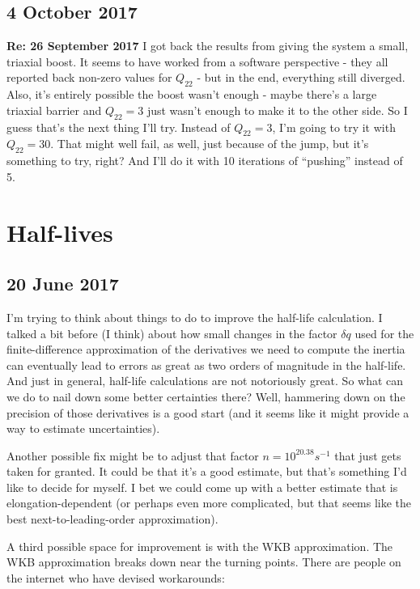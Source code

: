 \documentclass[]{report}
\begin{document}
\subsection*{4 October 2017}
\textbf{Re: 26 September 2017} I got back the results from giving the system a small, triaxial boost. It seems to have worked from a software perspective - they all reported back non-zero values for $Q_{22}$ - but in the end, everything still diverged. Also, it's entirely possible the boost wasn't enough - maybe there's a large triaxial barrier and $Q_{22}=3$ just wasn't enough to make it to the other side. So I guess that's the next thing I'll try. Instead of $Q_{22}=3$, I'm going to try it with $Q_{22}=30$. That might well fail, as well, just because of the jump, but it's something to try, right? And I'll do it with 10 iterations of ``pushing'' instead of 5.

\section*{Half-lives}
\subsection*{20 June 2017}
I'm trying to think about things to do to improve the half-life calculation. I talked a bit before (I think) about how small changes in the factor $\delta q$ used for the finite-difference approximation of the derivatives we need to compute the inertia can eventually lead to errors as great as two orders of magnitude in the half-life. And just in general, half-life calculations are not notoriously great. So what can we do to nail down some better certainties there? Well, hammering down on the precision of those derivatives is a good start (and it seems like it might provide a way to estimate uncertainties).

Another possible fix might be to adjust that factor $n=10^{20.38} s^{-1}$ that just gets taken for granted. It could be that it's a good estimate, but that's something I'd like to decide for myself. I bet we could come up with a better estimate that is elongation-dependent (or perhaps even more complicated, but that seems like the best next-to-leading-order approximation).

A third possible space for improvement is with the WKB approximation. The WKB approximation breaks down near the turning points. There are people on the internet who have devised workarounds:
\end{document}
